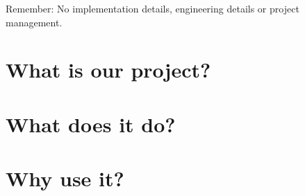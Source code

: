 Remember: No implementation details, engineering details or project management.
\section{What is our project?}
\section{What does it do?}
\section{Why use it?}
